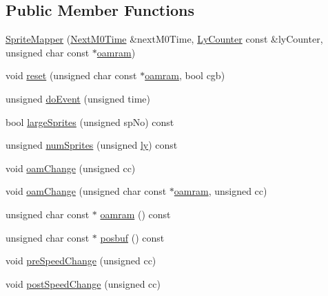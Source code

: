 \subsection*{Public Member Functions}
\begin{DoxyCompactItemize}
\item 
\hyperlink{classgambatte_1_1SpriteMapper_afa54d28e21f1ff73031a387fb8aefdce}{Sprite\+Mapper} (\hyperlink{classgambatte_1_1NextM0Time}{Next\+M0\+Time} \&next\+M0\+Time, \hyperlink{classgambatte_1_1LyCounter}{Ly\+Counter} const \&ly\+Counter, unsigned char const $\ast$\hyperlink{classgambatte_1_1SpriteMapper_a558ee1ff5817b79285f7cc91d627535b}{oamram})
\item 
void \hyperlink{classgambatte_1_1SpriteMapper_a30a75a0ef5dcae59f55152515a967843}{reset} (unsigned char const $\ast$\hyperlink{classgambatte_1_1SpriteMapper_a558ee1ff5817b79285f7cc91d627535b}{oamram}, bool cgb)
\item 
unsigned \hyperlink{classgambatte_1_1SpriteMapper_a1dc90dda342bb3587d91a763a35c9a79}{do\+Event} (unsigned time)
\item 
bool \hyperlink{classgambatte_1_1SpriteMapper_ad67ee3b9b5c1f188ba33f5716a3f5853}{large\+Sprites} (unsigned sp\+No) const
\item 
unsigned \hyperlink{classgambatte_1_1SpriteMapper_ad44d62550eb865da721b1092539647e8}{num\+Sprites} (unsigned \hyperlink{video_8cpp_ab1c1cf762ec2da5588c30a13cd60af91}{ly}) const
\item 
void \hyperlink{classgambatte_1_1SpriteMapper_a899e21a4d6356b9c3587872eb290d035}{oam\+Change} (unsigned cc)
\item 
void \hyperlink{classgambatte_1_1SpriteMapper_aa090796deeec5896abfeb6b5dfc41045}{oam\+Change} (unsigned char const $\ast$\hyperlink{classgambatte_1_1SpriteMapper_a558ee1ff5817b79285f7cc91d627535b}{oamram}, unsigned cc)
\item 
unsigned char const  $\ast$ \hyperlink{classgambatte_1_1SpriteMapper_a558ee1ff5817b79285f7cc91d627535b}{oamram} () const
\item 
unsigned char const  $\ast$ \hyperlink{classgambatte_1_1SpriteMapper_a9f316f5fb82169de7855d56d2446b793}{posbuf} () const
\item 
void \hyperlink{classgambatte_1_1SpriteMapper_a08aeaf6bb42e440b9f7f4066366b673b}{pre\+Speed\+Change} (unsigned cc)
\item 
void \hyperlink{classgambatte_1_1SpriteMapper_a20063931c4c6144769d9ce4c064fb374}{post\+Speed\+Change} (unsigned cc)
\item 

\end{DoxyCompactItemize}
